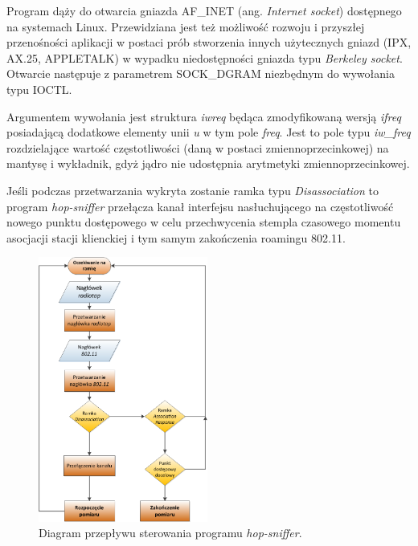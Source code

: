 Program dąży do otwarcia gniazda AF\_INET (ang. \emph{Internet socket}) dostępnego na systemach Linux. Przewidziana jest też możliwość rozwoju i przyszłej przenośności aplikacji w postaci prób stworzenia innych użytecznych gniazd (IPX, AX.25, APPLETALK) w wypadku niedostępności gniazda typu \emph{Berkeley socket}. Otwarcie następuje z parametrem SOCK\_DGRAM niezbędnym do wywołania typu IOCTL.

Argumentem wywołania jest struktura \emph{iwreq} będąca zmodyfikowaną wersją \emph{ifreq} posiadającą dodatkowe elementy unii \emph{u} w tym pole \emph{freq}. Jest to pole typu \emph{iw\_freq} rozdzielające wartość częstotliwości (daną w postaci zmiennoprzecinkowej) na mantysę i wykładnik, gdyż jądro nie udostępnia arytmetyki zmiennoprzecinkowej.


Jeśli podczas przetwarzania wykryta zostanie ramka typu \emph{Disassociation} to program \emph{hop-sniffer} przełącza kanał interfejsu nasłuchującego na częstotliwość nowego punktu dostępowego w celu przechwycenia stempla czasowego momentu asocjacji stacji klienckiej i tym samym zakończenia roamingu 802.11.

\begin{figure}[htb]
\begin{center}
\includegraphics[width=210px]{img/FlowDiagram}
\caption{Diagram przepływu sterowania programu \emph{hop-sniffer}.}
\label{FlowDiagram}
\end{center}
\end{figure}























